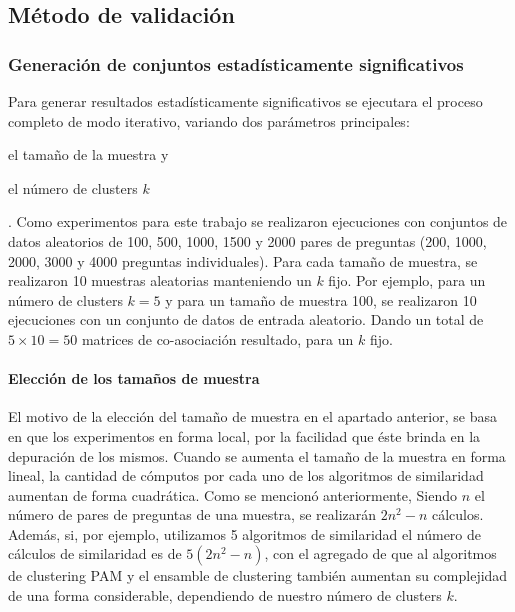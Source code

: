 \subsection{Método de validación}\label{metodo-validacion}

\subsubsection{Generación de conjuntos estadísticamente significativos}

Para generar resultados estadísticamente significativos se ejecutara el proceso completo de modo iterativo, variando dos parámetros principales: \begin{enumerate*} [label=(\roman*)] \item el tamaño de la muestra y \item el número de clusters \(k\)\end{enumerate*}. Como experimentos para este trabajo se realizaron ejecuciones con conjuntos de datos aleatorios de 100, 500, 1000, 1500 y 2000 pares de preguntas (200, 1000, 2000, 3000 y 4000 preguntas individuales). Para cada tamaño de muestra, se realizaron 10 muestras aleatorias manteniendo un \(k\) fijo. Por ejemplo, para un número de clusters \(k = 5\) y para un tamaño de muestra 100, se realizaron 10 ejecuciones con un conjunto de datos de entrada aleatorio. Dando un total de \(5 \times 10 = 50\) matrices de co-asociación resultado, para un \(k\) fijo.

\paragraph{Elección de los tamaños de muestra}
El motivo de la elección del tamaño de muestra en el apartado anterior, se basa en que los experimentos en forma local, por la facilidad que éste brinda en la depuración de los mismos. Cuando se aumenta el tamaño de la muestra en forma lineal, la cantidad de cómputos por cada uno de los algoritmos de similaridad aumentan de forma cuadrática. Como se mencionó anteriormente, Siendo \(n\) el número de pares de preguntas de una muestra, se realizarán \(2n^2-n\) cálculos. Además, si, por ejemplo, utilizamos 5 algoritmos de similaridad el número de cálculos de similaridad es de \(5(2n^2-n)\), con el agregado de que al algoritmos de clustering PAM y el ensamble de clustering también aumentan su complejidad de una forma considerable, dependiendo de nuestro número de clusters \(k\).

